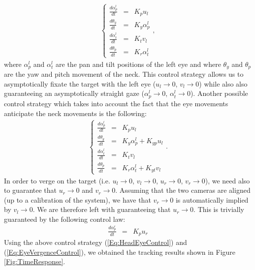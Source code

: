 \begin{eqnarray} 
\left\{ \begin{matrix}
\frac{d \alpha_p^l}{ d t} &=&   K_p u_l\\
\frac{d \theta_y}{ d t} &=&   K_y \alpha_p^l \\
\frac{d \alpha_t^l} {d t} &=&   K_t v_l\\
\frac{d \theta_p} {d t} &=&   K_r \alpha_t^l
\end{matrix} \right.,
\end{eqnarray}
where $\alpha_p^l$ and $\alpha_t^l$ are the pan and tilt positions of the left eye and where $\theta_y$ and $\theta_p$ are the yaw and pitch movement of the neck. This control strategy allows us to asymptotically fixate the target with the left eye ($u_l \rightarrow 0$, $v_l \rightarrow 0$) while also also guaranteeing an asymptotically  straight gaze ($\alpha_p^l \rightarrow 0$, $\alpha_t^l \rightarrow 0$). Another possible control strategy which takes into account the fact that the eye movements anticipate the neck movements is the following:
\begin{eqnarray} \label{Eq:HeadEyeControl}
\left\{ \begin{matrix}
\frac{d \alpha_p^l}{ d t} &=&   K_p u_l\\
\frac{d \theta_y}{ d t} &=&   K_y \alpha_p^l + K_{yp} u_l\\
\frac{d \alpha_t^l} {d t} &=&   K_t v_l\\
\frac{d \theta_p} {d t} &=&   K_r \alpha_t^l + K_{yt} v_l
\end{matrix} \right. .
\end{eqnarray}
In order to verge on the target (i.e. $u_l \rightarrow 0$, $v_l \rightarrow 0$, $u_r \rightarrow 0$, $v_r \rightarrow 0$), we need also to guarantee that $u_r \rightarrow 0$ and $v_r \rightarrow 0$. Assuming that the two cameras are aligned (up to a calibration of the system), we have that $v_r \rightarrow 0$ is automatically implied by $v_l \rightarrow 0$. We are therefore left with guaranteeing that $u_r \rightarrow 0$. This is trivially guaranteed by the following control law:
\begin{eqnarray} \label{Eq:EyeVergenceControl}
\frac{d \alpha_p^r}{ d t} &=&   K_p u_r
\end{eqnarray}
Using the above control strategy (\ref{Eq:HeadEyeControl}) and (\ref{Eq:EyeVergenceControl}),  we obtained the tracking results shown in Figure \ref{Fig:TimeResponse}.


